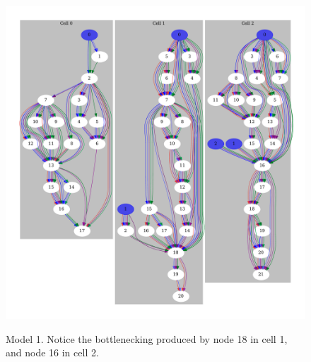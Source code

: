 \begin{figure}[ht]
    \centering
	\includegraphics[width=\linewidth, trim={0 1cm 0 1cm}, clip]{random-2-1} \\
    \caption[A sample randomly grown SpiderNet model]{Model 1. Notice the bottlenecking produced by node 18 in cell 1, and node 16 in cell 2. }
    \label{fig:spider_rand0_example}
\end{figure}

